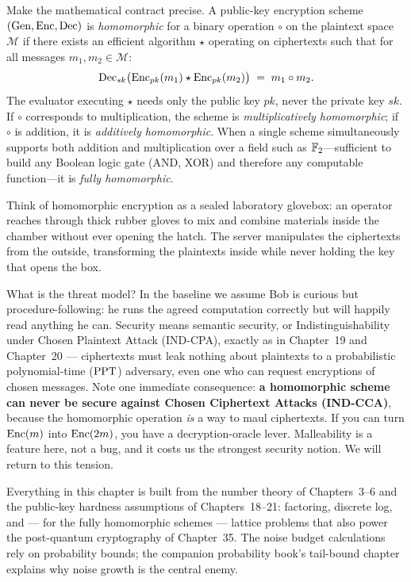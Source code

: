 Make the mathematical contract precise. A public-key encryption scheme $(\operatorname{Gen}, \operatorname{Enc}, \operatorname{Dec})$ is \emph{homomorphic} for a binary operation $\circ$ on the plaintext space $\mathcal{M}$ if there exists an efficient algorithm $\star$ operating on ciphertexts such that for all messages $m_1, m_2 \in \mathcal{M}$:
\[
  \operatorname{Dec}_{sk}\bigl(\operatorname{Enc}_{pk}(m_1) \star \operatorname{Enc}_{pk}(m_2)\bigr) \;=\; m_1 \circ m_2 .
\]
The evaluator executing $\star$ needs only the public key $pk$, never the private key $sk$. If $\circ$ corresponds to multiplication, the scheme is \emph{multiplicatively homomorphic}; if $\circ$ is addition, it is \emph{additively homomorphic}. When a single scheme simultaneously supports both addition and multiplication over a field such as $\mathbb{F}_2$---sufficient to build any Boolean logic gate (AND, XOR) and therefore any computable function---it is \emph{fully homomorphic}.

\begin{intuitionbox}
Think of homomorphic encryption as a sealed laboratory glovebox: an operator reaches through thick rubber gloves to mix and combine materials inside the chamber without ever opening the hatch. The server manipulates the ciphertexts from the outside, transforming the plaintexts inside while never holding the key that opens the box.
\end{intuitionbox}

What is the threat model? In the baseline we assume Bob is curious but procedure-following: he runs the agreed computation correctly but will happily read anything he can. Security means semantic security, or Indistinguishability under Chosen Plaintext Attack (IND-CPA), exactly as in Chapter~19 and Chapter~20 --- ciphertexts must leak nothing about plaintexts to a probabilistic polynomial-time ($\mathrm{PPT}$) adversary, even one who can request encryptions of chosen messages. Note one immediate consequence: \textbf{a homomorphic scheme can never be secure against Chosen Ciphertext Attacks (IND-CCA)}, because the homomorphic operation \emph{is} a way to maul ciphertexts. If you can turn $\operatorname{Enc}(m)$ into $\operatorname{Enc}(2m)$, you have a decryption-oracle lever. Malleability is a feature here, not a bug, and it costs us the strongest security notion. We will return to this tension.

\begin{connectionbox}
Everything in this chapter is built from the number theory of Chapters~3--6 and the public-key hardness assumptions of Chapters~18--21: factoring, discrete log, and --- for the fully homomorphic schemes --- lattice problems that also power the post-quantum cryptography of Chapter~35. The noise budget calculations rely on probability bounds; the companion probability book's tail-bound chapter explains why noise growth is the central enemy.
\end{connectionbox}

